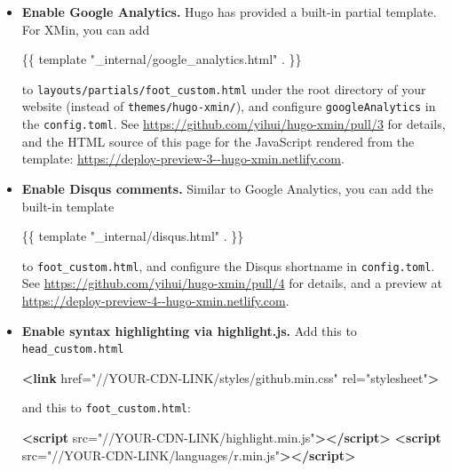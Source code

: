 \documentclass[12pt,]{krantz}
\makeatletter
\newenvironment{Shaded}{\begin{snugshade}}{\end{snugshade}}
\newcommand{\KeywordTok}[1]{\textcolor[rgb]{0.13,0.29,0.53}{\textbf{#1}}}
\newcommand{\NormalTok}[1]{#1}
\newcommand{\OtherTok}[1]{\textcolor[rgb]{0.56,0.35,0.01}{#1}}
\newcommand{\StringTok}[1]{\textcolor[rgb]{0.31,0.60,0.02}{#1}}
\newenvironment{kframe}{%
\medskip{}
\setlength{\fboxsep}{.8em}
 \def\at@end@of@kframe{}%
 \ifinner\ifhmode%
  \def\at@end@of@kframe{\end{minipage}}%
  \begin{minipage}{\columnwidth}%
 \fi\fi%
 \def\FrameCommand##1{\hskip\@totalleftmargin \hskip-\fboxsep
 \colorbox{shadecolor}{##1}\hskip-\fboxsep
     \hskip-\linewidth \hskip-\@totalleftmargin \hskip\columnwidth}%
 \MakeFramed {\advance\hsize-\width
   \@totalleftmargin\z@ \linewidth\hsize
   \@setminipage}}%
 {\par\unskip\endMakeFramed%
 \at@end@of@kframe}
\renewenvironment{Shaded}{\begin{kframe}}{\end{kframe}}
\theoremstyle{definition}
\theoremstyle{definition}
\theoremstyle{definition}
\theoremstyle{remark}
\makeatother
\begin{document}
\begin{itemize}
\item
  \textbf{Enable Google Analytics.} Hugo has
  provided a built-in partial template. For XMin, you can add

\begin{Shaded}
\begin{Highlighting}[]
\NormalTok{\{\{ template "_internal/google_analytics.html" . \}\}}
\end{Highlighting}
\end{Shaded}

  to \texttt{layouts/partials/foot\_custom.html} under the root
  directory of your website (instead of \texttt{themes/hugo-xmin/}), and
  configure \texttt{googleAnalytics} in the \texttt{config.toml}. See
  \url{https://github.com/yihui/hugo-xmin/pull/3} for details, and the
  HTML source of this page for the JavaScript rendered from the
  template: \url{https://deploy-preview-3--hugo-xmin.netlify.com}.
\item
  \textbf{Enable Disqus comments.} Similar to Google
  Analytics, you can add the built-in template

\begin{Shaded}
\begin{Highlighting}[]
\NormalTok{\{\{ template "_internal/disqus.html" . \}\}}
\end{Highlighting}
\end{Shaded}

  to \texttt{foot\_custom.html}, and configure the Disqus shortname in
  \texttt{config.toml}. See
  \url{https://github.com/yihui/hugo-xmin/pull/4} for details, and a
  preview at \url{https://deploy-preview-4--hugo-xmin.netlify.com}.
\item
  \textbf{Enable syntax highlighting via highlight.js.} Add
  this to \texttt{head\_custom.html}

\begin{Shaded}
\begin{Highlighting}[]
\KeywordTok{<link}\OtherTok{ href=}\StringTok{"//YOUR-CDN-LINK/styles/github.min.css"}\OtherTok{ rel=}\StringTok{"stylesheet"}\KeywordTok{>}
\end{Highlighting}
\end{Shaded}

  and this to \texttt{foot\_custom.html}:

\begin{Shaded}
\begin{Highlighting}[]
\KeywordTok{<script}\OtherTok{ src=}\StringTok{"//YOUR-CDN-LINK/highlight.min.js"}\KeywordTok{></script>}
\KeywordTok{<script}\OtherTok{ src=}\StringTok{"//YOUR-CDN-LINK/languages/r.min.js"}\KeywordTok{></script>}


\end{Highlighting}
\end{Shaded}
\end{itemize}
\end{document}
